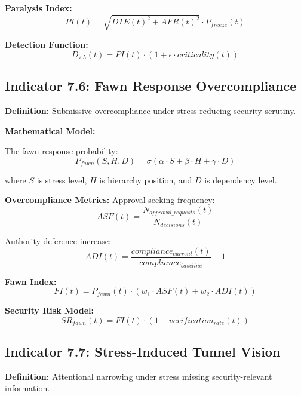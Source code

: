 \documentclass[11pt,a4paper]{article}
\begin{document}
\textbf{Paralysis Index:}
\begin{equation}
PI(t) = \sqrt{DTE(t)^2 + AFR(t)^2} \cdot P_{freeze}(t)
\end{equation}

\textbf{Detection Function:}
\begin{equation}
D_{7.5}(t) = PI(t) \cdot \left(1 + \epsilon \cdot criticality(t)\right)
\end{equation}

\subsection{Indicator 7.6: Fawn Response Overcompliance}

\textbf{Definition:} Submissive overcompliance under stress reducing security scrutiny.

\textbf{Mathematical Model:}

The fawn response probability:
\begin{equation}
P_{fawn}(S,H,D) = \sigma(\alpha \cdot S + \beta \cdot H + \gamma \cdot D)
\end{equation}

where $S$ is stress level, $H$ is hierarchy position, and $D$ is dependency level.

\textbf{Overcompliance Metrics:}
Approval seeking frequency:
\begin{equation}
ASF(t) = \frac{N_{approval\_requests}(t)}{N_{decisions}(t)}
\end{equation}

Authority deference increase:
\begin{equation}
ADI(t) = \frac{compliance_{current}(t)}{compliance_{baseline}} - 1
\end{equation}

\textbf{Fawn Index:}
\begin{equation}
FI(t) = P_{fawn}(t) \cdot (w_1 \cdot ASF(t) + w_2 \cdot ADI(t))
\end{equation}

\textbf{Security Risk Model:}
\begin{equation}
SR_{fawn}(t) = FI(t) \cdot (1 - verification_{rate}(t))
\end{equation}

\subsection{Indicator 7.7: Stress-Induced Tunnel Vision}

\textbf{Definition:} Attentional narrowing under stress missing security-relevant information.
\end{document}
